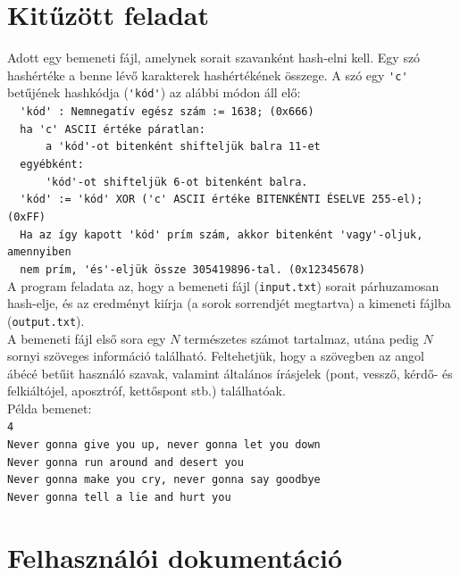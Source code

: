 \documentclass[12pt]{article}
\begin{document}
\section{Kitűzött feladat}

Adott egy bemeneti fájl, amelynek sorait szavanként hash-elni kell.
Egy szó hashértéke a benne lévő karakterek hashértékének összege.
A szó egy \verb|'c'| betűjének hashkódja (\verb|'kód'|) az alábbi módon áll elő:
\\
\verb|  'kód' : Nemnegatív egész szám := 1638; (0x666)| \\
\verb|  ha 'c' ASCII értéke páratlan:| \\
\verb|      a 'kód'-ot bitenként shifteljük balra 11-et| \\
\verb|  egyébként:| \\
\verb|      'kód'-ot shifteljük 6-ot bitenként balra.| \\
\verb|  'kód' := 'kód' XOR ('c' ASCII értéke BITENKÉNTI ÉSELVE 255-el); (0xFF)| \\
\verb|  Ha az így kapott 'kód' prím szám, akkor bitenként 'vagy'-oljuk, amennyiben| \\
\verb|  nem prím, 'és'-eljük össze 305419896-tal. (0x12345678)|
\\
A program feladata az, hogy a bemeneti fájl (\verb|input.txt|) sorait párhuzamosan hash-elje,
és az eredményt kiírja (a sorok sorrendjét megtartva) a kimeneti fájlba (\verb|output.txt|).
\\
A bemeneti fájl első sora egy $N$ természetes számot tartalmaz, utána pedig $N$ sornyi
szöveges információ található. Feltehetjük, hogy a szövegben az angol ábécé betűit
használó szavak, valamint általános írásjelek (pont, vessző, kérdő- és felkiáltójel,
aposztróf, kettőspont stb.) találhatóak.
\\
Példa bemenet: \\
\verb|4| \\
\verb|Never gonna give you up, never gonna let you down| \\
\verb|Never gonna run around and desert you| \\
\verb|Never gonna make you cry, never gonna say goodbye| \\
\verb|Never gonna tell a lie and hurt you| \\

\section{Felhasználói dokumentáció}
\end{document}
